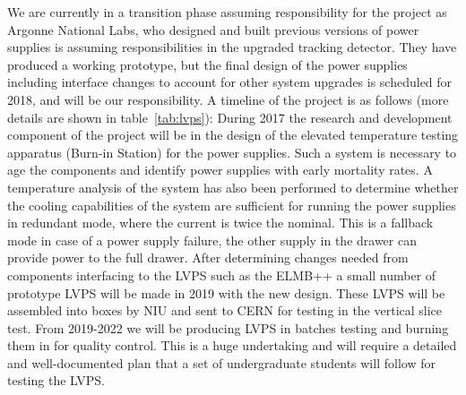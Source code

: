 \documentclass[11pt]{article}
\begin{document}
We are currently in a transition phase assuming responsibility for the project as Argonne National Labs, who designed and built previous versions of power supplies is assuming responsibilities in the upgraded tracking detector. 
They have produced a working prototype, but the final design of the power supplies  
including interface changes to account for other system upgrades is scheduled for 2018, and will be our responsibility.
A timeline of the project is as follows (more details are shown in table~\ref{tab:lvps}):
During 2017 the research and development component of the project will be in the design of the elevated temperature testing apparatus (Burn-in Station)
for the power supplies.  Such a system is necessary to age the components and identify power supplies with early mortality rates.  A temperature analysis of the system has also been performed to determine whether the cooling capabilities of the system are sufficient 
for running the power supplies in redundant mode, where the current is twice the nominal.  This is a fallback mode in case of a power supply failure, the other supply in the drawer can provide power to the full drawer.
After determining changes needed from components interfacing to the LVPS such as the ELMB++ a small number of prototype LVPS will be made in 2019 with the new design.
These LVPS will be assembled into boxes by NIU and sent to CERN for testing in the vertical slice test. From 2019-2022 we will be producing LVPS in batches testing and burning them in for quality control.  This is a huge undertaking and will require a detailed and well-documented 
plan that a set of undergraduate students will follow for testing the LVPS.
\end{document}
